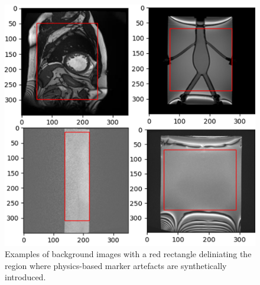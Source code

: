 \documentclass[conference]{IEEEtran}
\begin{document}

\begin{figure}
    \centering
    \includegraphics[width=1\linewidth]{Conference//img/roi-example-background-dataset.png}
    \caption{Examples of background images with a red rectangle deliniating the region where physics-based marker artefacts are synthetically introduced.}
    \label{fig:background-dataset}
\end{figure}
\end{document}
